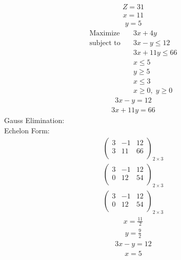 \documentclass{article}
\begin{document}
\begin{align*}
Z=31\end{align*}
\begin{align*}
x=11\end{align*}
\begin{align*}
y=5\end{align*}
\begin{align*}
\text{Maximize} \quad & 3x + 4y\\
\text{subject to} \quad
& 3x - y\le12\\
& 3x + 11y\le66\\
& x\le5\\
& y\ge5\\
& x\le3\\
& x\ge0,\; y\ge0\end{align*}
\begin{align*}
3x - y=12\end{align*}
\begin{align*}
3x + 11y=66\end{align*}
Gauss Elimination:\\
Echelon Form:\\
\begin{align*}
\left(
\begin{array}{cc|c}
3 & -1 & 12\\
3 & 11 & 66\\
\end{array}
\right)_{2\times 3}
\end{align*}
\begin{align*}
\left(
\begin{array}{cc|c}
3 & -1 & 12\\
0 & 12 & 54\\
\end{array}
\right)_{2\times 3}
\end{align*}
\begin{align*}
\left(
\begin{array}{cc|c}
3 & -1 & 12\\
0 & 12 & 54\\
\end{array}
\right)_{2\times 3}
\end{align*}
\begin{align*}
x=\frac{11}{2}\end{align*}
\begin{align*}
y=\frac{9}{2}\end{align*}
\begin{align*}
3x - y=12\end{align*}
\begin{align*}
x=5\end{align*}
\end{document}
